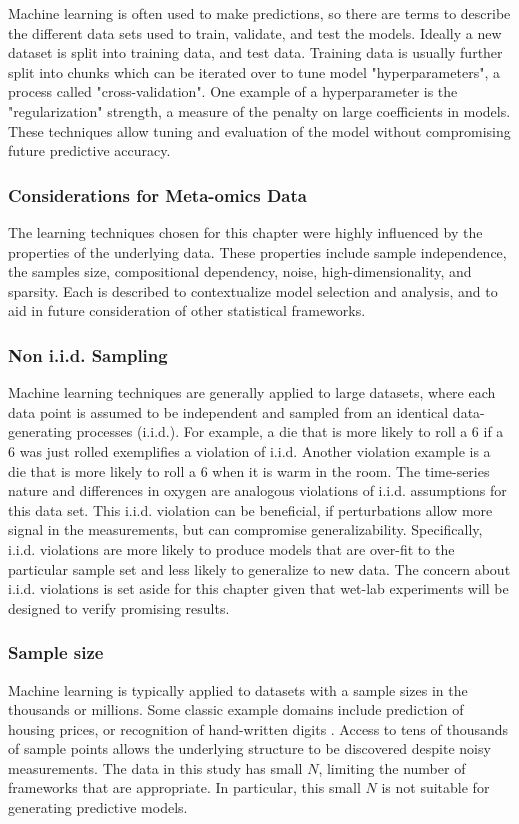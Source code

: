 Machine learning is often used to make predictions, so there are terms to describe the different data sets used to train, validate, and test the models.
Ideally a new dataset is split into training data, and test data.
Training data is usually further split into chunks which can be iterated over to tune model "hyperparameters", a process called "cross-validation". %
One example of a hyperparameter is the "regularization" strength, a measure of the penalty on large coefficients in models. %
These techniques allow tuning and evaluation of the model without compromising future predictive accuracy.

\subsubsection{Considerations for Meta-omics Data}

The learning techniques chosen for this chapter were highly influenced by the properties of the underlying data.
These properties include sample independence, the samples size, compositional dependency, noise, high-dimensionality, and sparsity.
Each is described to contextualize model selection and analysis, and to aid in future consideration of other statistical frameworks.

\subsubsection{Non i.i.d. Sampling}
Machine learning techniques are generally applied to large datasets, where each data point is assumed to be independent and sampled from an identical data-generating processes (i.i.d.).
For example, a die that is more likely to roll a 6 if a 6 was just rolled exemplifies a violation of i.i.d.
Another violation example is a die that is more likely to roll a 6 when it is warm in the room.
The time-series nature and differences in oxygen are analogous violations of i.i.d. assumptions for this data set.
This i.i.d. violation can be beneficial, if perturbations allow more signal in the measurements, but can compromise generalizability.
Specifically, i.i.d. violations are more likely to produce models that are over-fit to the particular sample set and less likely to generalize to new data.
The concern about i.i.d. violations is set aside for this chapter given that wet-lab experiments will be designed to verify promising results.

\subsubsection{Sample size}
Machine learning is typically applied to datasets with a sample sizes in the thousands or millions.
Some classic example domains include prediction of housing prices, or recognition of hand-written digits \cite{friedman2001}.
Access to tens of thousands of sample points allows the underlying structure to be discovered despite noisy measurements.
The data in this study has small $N$, limiting the number of frameworks that are appropriate.
In particular, this small $N$ is not suitable for generating predictive models.

